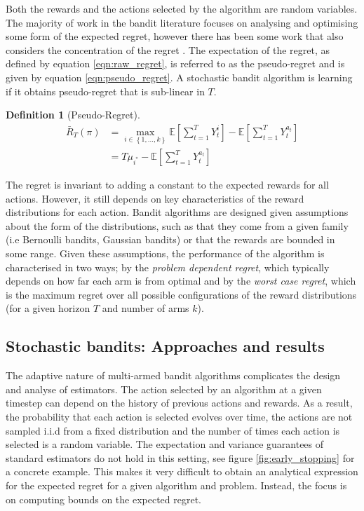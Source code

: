 \documentclass[11pt,a4paper,oneside]{book}
\newcommand{\E}[1]{\mathbb E\left[{#1}\right]}
\newcommand{\set}[1]{\left\{#1\right\}}
\newcommand{\eqn}[1]{\begin{align}#1\end{align}}
\newcommand{\cfb}[2]{{#1}_t^{#2}} %
\newcommand{\regret}{\bar{R}_{T}} %
\theoremstyle{plain}
\theoremstyle{definition}
\newtheorem{definition}[theorem]{Definition}
\begin{document}
Both the rewards and the actions selected by the algorithm are random variables. The majority of work in the bandit literature focuses on analysing and optimising some form of the expected regret, however there has been some work that also considers the concentration of the regret \citep{Auer1995,Audibert2007,Audibert2009exploration}. The expectation of the regret, as defined by equation \ref{eqn:raw_regret}, is referred to as the pseudo-regret \citep{Bubeck2012} and is given by equation \ref{eqn:pseudo_regret}. A stochastic bandit algorithm is learning if it obtains pseudo-regret that is sub-linear in $T$. 

\vspace{0.5cm}
\begin{definition}[Pseudo-Regret]
\eqn{
\label{eqn:pseudo_regret}
\regret(\pi) &= \max_{i \in \set{1,...,k}}\E{\sum_{t=1}^T{\cfb{Y}{i}}} - \E{\sum_{t=1}^T{\cfb{Y}{a_t}}} \\
&= T\mu_{i^*} - \E{\sum_{t=1}^T{\cfb{Y}{a_t}}}
}
\end{definition}

The regret is invariant to adding a constant to the expected rewards for all actions. However, it still depends on key characteristics of the reward distributions for each action. Bandit algorithms are designed given assumptions about the form of the distributions, such as that they come from a given family (i.e Bernoulli bandits, Gaussian bandits) or that the rewards are bounded in some range. Given these assumptions, the performance of the algorithm is characterised in two ways; by the \emph{problem dependent regret}, which typically depends on how far each arm is from optimal and by the \emph{worst case regret}, which is the maximum regret over all possible configurations of the reward distributions (for a given horizon $T$ and number of arms $k$).





\subsection{Stochastic bandits: Approaches and results}

The adaptive nature of multi-armed bandit algorithms complicates the design and analyse of estimators. The action selected by an algorithm at a given timestep can depend on the history of previous actions and rewards. As a result, the probability that each action is selected evolves over time, the actions are not sampled i.i.d from a fixed distribution and the number of times each action is selected is a random variable. The expectation and variance guarantees of standard estimators do not hold in this setting, see figure \ref{fig:early_stopping} for a concrete example. This makes it very difficult to  obtain an analytical expression for the expected regret for a given algorithm and problem. Instead, the focus is on computing bounds on the expected regret. 
\end{document}
